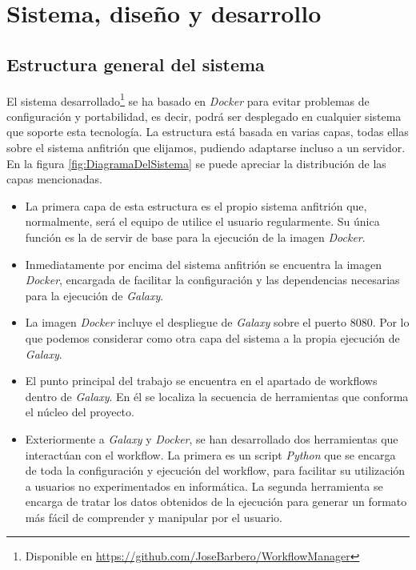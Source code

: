 \chapter{Sistema, diseño y desarrollo}
\label{chap:sistemadesarrollado}

\section{Estructura general del sistema}

El sistema desarrollado\footnote{Disponible en \url{https://github.com/JoseBarbero/WorkflowManager}} se ha basado en \textit{Docker} para evitar problemas de configuración y portabilidad, es decir, podrá ser desplegado en cualquier sistema que soporte esta tecnología. La estructura está basada en varias capas, todas ellas sobre el sistema anfitrión que elijamos, pudiendo adaptarse incluso a un servidor. En la figura   \ref{fig:DiagramaDelSistema} se puede apreciar la distribución de las capas mencionadas. 

\begin{itemize}
\item La primera capa de esta estructura es el propio sistema anfitrión que, normalmente, será el equipo de utilice el usuario regularmente. Su única función es la de servir de base para la ejecución de la imagen {\itshape{Docker}}.
\item Inmediatamente por encima del sistema anfitrión se encuentra la imagen {\itshape{Docker}}, encargada de facilitar la configuración y las dependencias necesarias para la ejecución de {\itshape{Galaxy}}.
\item La imagen {\itshape{Docker}} incluye el despliegue de {\itshape{Galaxy}} sobre el puerto 8080. Por lo que podemos considerar como otra capa del sistema a la propia ejecución de {\itshape{Galaxy}}.
\item El punto principal del trabajo se encuentra en el apartado de workflows dentro de {\itshape{Galaxy}}. En él se localiza la secuencia de herramientas que conforma el núcleo del proyecto.
\item Exteriormente a {\itshape{Galaxy}} y {\itshape{Docker}}, se han desarrollado dos herramientas que interactúan con el workflow. La primera es un script {\itshape{Python}} que se encarga de toda la configuración y ejecución del workflow, para facilitar su utilización a usuarios no experimentados en informática. La segunda herramienta se encarga de tratar los datos obtenidos de la ejecución para generar un formato más fácil de comprender y manipular por el usuario.
\end{itemize}

